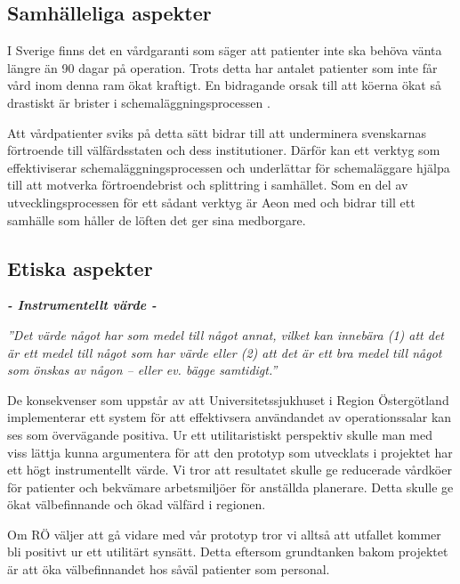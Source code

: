 \subsection{Samhälleliga aspekter}

I Sverige finns det en vårdgaranti som säger att patienter inte ska behöva vänta längre än 90 dagar på operation. Trots detta har antalet patienter som inte får vård inom denna ram ökat kraftigt. En bidragande orsak till att köerna ökat så drastiskt är brister i schemaläggningsprocessen \cite{vardko}.

Att vårdpatienter sviks på detta sätt bidrar till att underminera svenskarnas förtroende till välfärdsstaten och dess institutioner. Därför kan ett verktyg som effektiviserar schemaläggningsprocessen och underlättar för schemaläggare hjälpa till att motverka förtroendebrist och splittring i samhället. Som en del av utvecklingsprocessen för ett sådant verktyg är Aeon med och bidrar till ett samhälle som håller de löften det ger sina medborgare.

\subsection{Etiska aspekter}
\vspace{1em}
\begin{minipage}{1\linewidth}
\begin{center}
\textbf{\textit{- Instrumentellt värde -}}

\emph{''Det värde något har som medel till något annat, vilket kan innebära (1) att det är ett medel till något som har värde eller (2) att det är ett bra medel till något som önskas av någon – eller ev. bägge samtidigt.''} \cite{ne}

\end{center}
\end{minipage}

De konsekvenser som uppstår av att Universitetssjukhuset i Region Östergötland implementerar ett system för att effektivsera användandet av operationssalar kan ses som övervägande positiva. Ur ett utilitaristiskt perspektiv skulle man med viss lättja kunna argumentera för att den prototyp som utvecklats i projektet har ett högt instrumentellt värde. Vi tror att resultatet skulle ge reducerade vårdköer för patienter och bekvämare arbetsmiljöer för anställda planerare. Detta skulle ge ökat välbefinnande och ökad välfärd i regionen.

Om RÖ väljer att gå vidare med vår prototyp tror vi alltså att utfallet kommer bli positivt ur ett utilitärt synsätt. Detta eftersom grundtanken bakom projektet är att öka välbefinnandet hos såväl patienter som personal.

